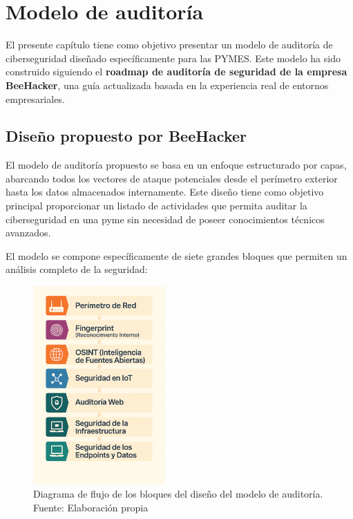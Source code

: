 \documentclass[a4paper, 10pt]{article}
\begin{document}
\clearpage



\section{Modelo de auditoría}

El presente capítulo tiene como objetivo presentar un modelo de auditoría de ciberseguridad diseñado específicamente para las PYMES. 
Este modelo ha sido construido siguiendo el \textbf{roadmap de auditoría de seguridad de la empresa BeeHacker}, 
una guía actualizada basada en la experiencia real de entornos empresariales. 
\par\vspace{0.5cm}

\subsection{Diseño propuesto por BeeHacker}

El modelo de auditoría propuesto se basa en un enfoque estructurado por capas, abarcando todos los vectores de ataque 
potenciales desde el perímetro exterior hasta los datos almacenados internamente. 
Este diseño tiene como objetivo principal proporcionar un listado de actividades que permita
auditar la ciberseguridad en una pyme sin necesidad de poseer conocimientos técnicos avanzados. 



\par\vspace{0.5cm}

El modelo se compone específicamente de siete grandes bloques que permiten un análisis completo de la seguridad:

\begin{figure}[H]
    \centering
    \includegraphics[width=0.45\textwidth]{images/diseno.png}
    \caption{Diagrama de flujo de los bloques del diseño del modelo de auditoría. Fuente: Elaboración propia}
    \label{fig:diseno_modelo_auditoria}
\end{figure}
\end{document}
